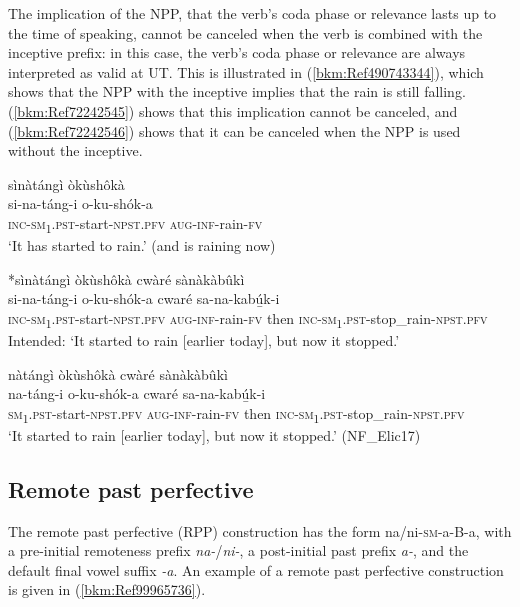 The implication of the NPP, that the verb’s coda phase or relevance lasts up to the time of speaking, cannot be canceled when the verb is combined with the inceptive prefix: in this case, the verb’s coda phase or relevance are always interpreted as valid at UT. This is illustrated in (\ref{bkm:Ref490743344}), which shows that the NPP with the inceptive implies that the rain is still falling. (\ref{bkm:Ref72242545}) shows that this implication cannot be canceled, and (\ref{bkm:Ref72242546}) shows that it can be canceled when the NPP is used without the inceptive.

\ea
\label{bkm:Ref490743344}
sìnàtángì òkùshôkà\\
\gll si-na-táng-i        o-ku-shók-a\\
\textsc{inc}-\textsc{sm}\textsubscript{1}.\textsc{pst}-start-\textsc{npst}.\textsc{pfv}  \textsc{aug}-\textsc{inf}-rain-\textsc{fv}\\
\glt ‘It has started to rain.’ (and is raining now)
\z

\ea
\label{bkm:Ref72242545}
*sìnàtángì òkùshôkà cwàré sànàkàbûkì\\
\gll si-na-táng-i        o-ku-shók-a cwaré  sa-na-kabú̲k-i \\
\textsc{inc}-\textsc{sm}\textsubscript{1}.\textsc{pst}-start-\textsc{npst}.\textsc{pfv}  \textsc{aug}-\textsc{inf}-rain-\textsc{fv} 
then  \textsc{inc}-\textsc{sm}\textsubscript{1}.\textsc{pst}-stop\_rain-\textsc{npst}.\textsc{pfv}\\
\glt Intended: ‘It started to rain [earlier today], but now it stopped.’
\z

\ea
\label{bkm:Ref72242546}
nàtángì òkùshôkà cwàré sànàkàbûkì\\
\gll na-táng-i      o-ku-shók-a cwaré  sa-na-kabú̲k-i \\
\textsc{sm}\textsubscript{1}.\textsc{pst}-start-\textsc{npst}.\textsc{pfv}  \textsc{aug}-\textsc{inf}-rain-\textsc{fv}
then  \textsc{inc}-\textsc{sm}\textsubscript{1}.\textsc{pst}-stop\_rain-\textsc{npst}.\textsc{pfv}\\
\glt ‘It started to rain [earlier today], but now it stopped.’ (NF\_Elic17)
\z
\subsection{Remote past perfective}
\label{bkm:Ref468174257}\label{bkm:Ref451515182}\hypertarget{Toc75352682}{}\label{bkm:Ref489260766}
The remote past perfective (RPP) construction has the form na/ni-\textsc{sm}-a-B-a, with a pre-initial remoteness prefix \textit{na-}/\textit{ni-}, a post-initial past prefix \textit{a-}, and the default final vowel suffix \textit{-a}. An example of a remote past perfective construction is given in (\ref{bkm:Ref99965736}).

